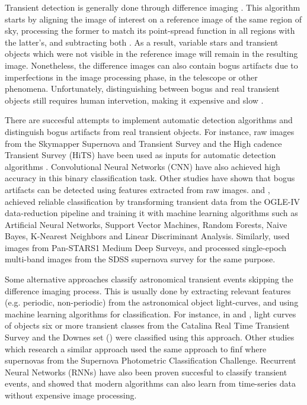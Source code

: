 \documentclass[a4paper,fleqn,usenatbib]{mnras}
\begin{document}
Transient detection is generally done through 
difference imaging \citep{1507.05137,1608.01733,1708.02850}. 
This algorithm starts by aligning the image of interest on a reference image of the
same region of sky, processing the former to match its point-spread
function in all regions with the latter's, and subtracting both
\citep{astro-ph/9712287}. 
As a result, variable stars and transient objects which were not
visible in the reference image will remain in the resulting
image. 
Nonetheless, the difference images can also contain bogus
artifacts due to imperfections in the image processing
phase, in the telescope or other phenomena. 
Unfortunately, distinguishing between bogus and real transient objects
still requires human intervetion, making it expensive and slow
\citep{2011arXiv1110.4655D}.  


There are succesful attempts to implement automatic detection
algorithms and distinguish bogus artifacts from real transient
objects.  
For instance, raw images from the  Skymapper Supernova and Transient
Survey and the High cadence Transient Survey (HiTS) have been used as
inputs for automatic detection algorithms \citep{1708.08947,1701.00458}.
Convolutional Neural Networks (CNN) have also achieved
high accuracy in this binary classification task.
Other studies have shown that bogus artifacts can be detected using
features extracted from raw images. 
\cite{1601.06151} and \cite{1601.06320}, achieved reliable
classification by transforming transient data from the OGLE-IV
data-reduction pipeline and training it with machine learning
algorithms such as Artificial Neural Networks, Support Vector
Machines, Random Forests, Naive Bayes, K-Nearest Neighbors and Linear
Discriminant Analysis.  
Similarly, \cite{1501.05470} used images from Pan-STARS1 Medium Deep
Surveys, and \cite{1407.4118} processed single-epoch multi-band images
from the SDSS supernova survey for the same purpose.  



Some alternative approaches classify astronomical transient
events skipping the difference imaging process. 
This is usually done by extracting relevant features (e.g. periodic,
non-periodic) from the astronomical object light-curves, and using
machine learning algorithms for classification. 
For instance, in \cite{1401.3211} and \cite{1601.03931}, light curves
of objects six or more transient classes from the Catalina Real Time
Transient Survey and the Downes set (\cite{d05}) were
classified using this approach. 
Other studies which research a similar approach
\cite{1603.00882} used the same approach to finf 
where supernovas from the Supernova Photometric Classification
Challenge.
Recurrent Neural Networks (RNNs) have also been proven succesful to
classify transient events, \cite{1606.07442} and \cite{1710.06804}
showed that  modern algorithms can also learn from time-series data
without expensive image processing.    
\end{document}
